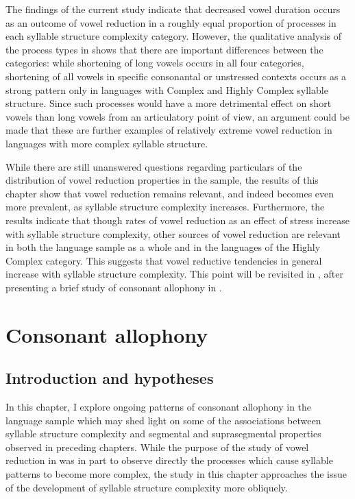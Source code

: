   The findings of the current study indicate that decreased vowel duration occurs as an outcome of vowel reduction in a roughly equal proportion of processes in each syllable structure complexity category. However, the qualitative analysis of the process types in  shows that there are important differences between the categories: while shortening of long vowels occurs in all four categories, shortening of all vowels in specific consonantal or unstressed contexts occurs as a strong pattern only in languages with Complex and Highly Complex syllable structure. Since such processes would have a more detrimental effect on short vowels than long vowels from an articulatory point of view, an argument could be made that these are further examples of relatively extreme vowel reduction in languages with more complex syllable structure.

  While there are still unanswered questions regarding particulars of the distribution of vowel reduction properties in the sample, the results of this chapter show that vowel reduction remains relevant, and indeed becomes even more prevalent, as syllable structure complexity increases. Furthermore, the results indicate that though rates of vowel reduction as an effect of stress increase with syllable structure complexity, other sources of vowel reduction are relevant in both the language sample as a whole and in the languages of the Highly Complex category. This suggests that vowel reductive tendencies in general increase with syllable structure complexity. This point will be revisited in , after presenting a brief study of consonant allophony in .

\chapter{Consonant allophony}\label{sec:7}
\section{Introduction and hypotheses}\label{sec:7.1}

  In this chapter, I explore ongoing patterns of consonant allophony in the language sample which may shed light on some of the associations between syllable structure complexity and segmental and suprasegmental properties observed in preceding chapters. While the purpose of the study of vowel reduction in  was in part to observe directly the processes which cause syllable patterns to become more complex, the study in this chapter approaches the issue of the development of syllable structure complexity more obliquely. 

